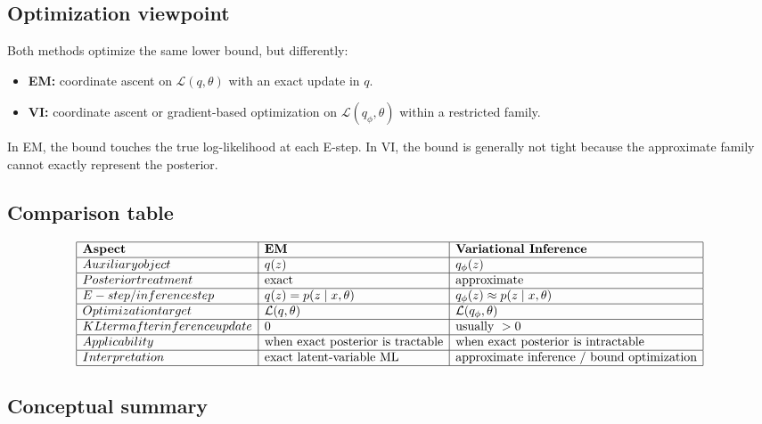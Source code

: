 \subsection{Optimization viewpoint}

Both methods optimize the same lower bound, but differently:

\begin{itemize}
    \item \textbf{EM:} coordinate ascent on \(\mathcal{L}(q,\theta)\) with an exact update in \(q\).
    \item \textbf{VI:} coordinate ascent or gradient-based optimization on \(\mathcal{L}(q_\phi,\theta)\) within a restricted family.
\end{itemize}

In EM, the bound touches the true log-likelihood at each E-step. In VI, the bound is generally not tight because the approximate family cannot exactly represent the posterior.

\subsection{Comparison table}

\[
\begin{array}{|l|l|l|}
\hline
\textbf{Aspect} & \textbf{EM} & \textbf{Variational Inference} \\
\hline
Auxiliary object & q(z) & q_\phi(z) \\
\hline
Posterior treatment & \text{exact} & \text{approximate} \\
\hline
E-step / inference step &
q(z)=p(z\mid x,\theta) &
q_\phi(z)\approx p(z\mid x,\theta) \\
\hline
Optimization target & \mathcal{L}(q,\theta) & \mathcal{L}(q_\phi,\theta) \\
\hline
KL term after inference update & 0 & \text{usually } > 0 \\
\hline
Applicability & \text{when exact posterior is tractable} &
\text{when exact posterior is intractable} \\
\hline
Interpretation & \text{exact latent-variable ML} &
\text{approximate inference / bound optimization} \\
\hline
\end{array}
\]

\subsection{Conceptual summary}

